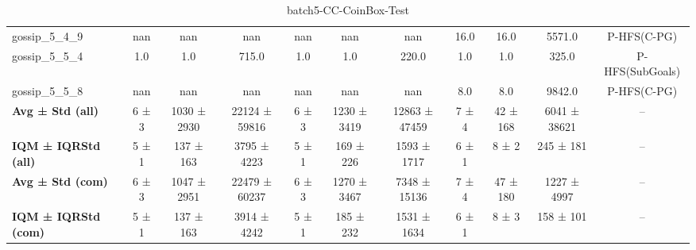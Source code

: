 \begin{table}[!ht]
\begin{tabular}{l|ccc|ccc|cccc}
gossip\_5\_4\_9 & nan & nan & nan & nan & nan & nan & 16.0 & 16.0 & 5571.0 & P-HFS(C-PG) \\
gossip\_5\_5\_4 & 1.0 & 1.0 & 715.0 & 1.0 & 1.0 & 220.0 & 1.0 & 1.0 & 325.0 & P-HFS(SubGoals) \\
gossip\_5\_5\_8 & nan & nan & nan & nan & nan & nan & 8.0 & 8.0 & 9842.0 & P-HFS(C-PG) \\
\hline
\textbf{Avg ± Std (all)} & 6 ± 3 & 1030 ± 2930 & 22124 ± 59816 & 6 ± 3 & 1230 ± 3419 & 12863 ± 47459 & 7 ± 4 & 42 ± 168 & 6041 ± 38621 & -- \\
\textbf{IQM ± IQRStd (all)} & 5 ± 1 & 137 ± 163 & 3795 ± 4223 & 5 ± 1 & 169 ± 226 & 1593 ± 1717 & 6 ± 1 & 8 ± 2 & 245 ± 181 & -- \\
\textbf{Avg ± Std (com)} & 6 ± 3 & 1047 ± 2951 & 22479 ± 60237 & 6 ± 3 & 1270 ± 3467 & 7348 ± 15136 & 7 ± 4 & 47 ± 180 & 1227 ± 4997 & -- \\
\textbf{IQM ± IQRStd (com)} & 5 ± 1 & 137 ± 163 & 3914 ± 4242 & 5 ± 1 & 185 ± 232 & 1531 ± 1634 & 6 ± 1 & 8 ± 3 & 158 ± 101 & -- \\
\end{tabular}
\caption{batch5-CC-CoinBox-Test}
\label{tab:batch5_CC-CoinBox_comparison_test}
\end{table}

